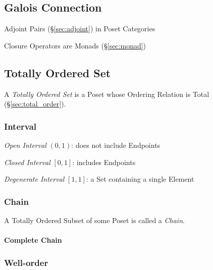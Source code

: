 \subsection{Galois Connection}\label{sec:galois_connection}

Adjoint Pairs (\S\ref{sec:adjoint}) in Poset Categories

Closure Operators are Monads (\S\ref{sec:monad})



\subsection{Totally Ordered Set}\label{sec:totally_ordered}

A \emph{Totally Ordered Set} is a Poset whose Ordering Relation is
Total (\S\ref{sec:total_order}).



\subsubsection{Interval}\label{sec:interval}

\emph{Open Interval} $(0,1)$: does not include Endpoints

\emph{Closed Interval} $[0,1]$: includes Endpoints

\emph{Degenerate Interval} $[1,1]$: a Set containing a single Element



\subsubsection{Chain}\label{sec:chain}

A Totally Ordered Subset of some Poset is called a \emph{Chain}.

\paragraph{Complete Chain}\label{sec:complete_chain}



\subsubsection{Well-order}\label{sec:well_order}

